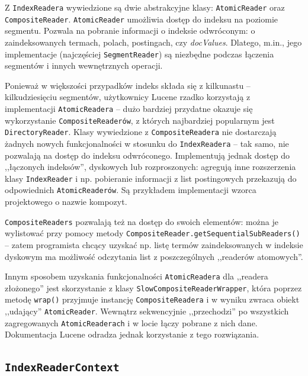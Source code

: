 Z \texttt{IndexReadera} wywiedzione są dwie abstrakcyjne klasy: \texttt{AtomicReader} oraz \texttt{CompositeReader}. \texttt{AtomicReader} umożliwia dostęp do indeksu na poziomie segmentu. Pozwala na pobranie informacji o indeksie odwróconym: o zaindeksowanych termach, polach, postingach, czy \emph{docValues}. Dlatego, m.in., jego implementacje (najczęściej \texttt{SegmentReader}) są niezbędne podczas łączenia segmentów i innych wewnętrznych operacji.

Ponieważ w większości przypadków indeks składa się z kilkunastu -- kilkudziesięciu segmentów, użytkownicy Lucene rzadko korzystają z implementacji \texttt{AtomicReadera} -- dużo bardziej przydatne okazuje się wykorzystanie \texttt{CompositeReaderów}, z których najbardziej popularnym jest \texttt{DirectoryReader}. Klasy wywiedzione z \texttt{CompositeReadera} nie dostarczają żadnych nowych funkcjonalności w stosunku do \texttt{IndexReadera} -- tak samo, nie pozwalają na dostęp do indeksu odwróconego. Implementują jednak dostęp do ,,łączonych indeksów'', dyskowych lub rozproszonych: agregują inne rozszerzenia klasy \texttt{IndexReader} i np. pobieranie informacji z list postingowych przekazują do odpowiednich \texttt{AtomicReaderów}. Są przykładem implementacji wzorca projektowego o nazwie kompozyt.

\texttt{CompositeReaders} pozwalają też na dostęp do swoich elementów: można je wylistować przy pomocy metody \texttt{CompositeReader.getSequentialSubReaders()} -- zatem programista chcący uzyskać np. listę termów zaindeksowanych w indeksie dyskowym ma możliwość odczytania list z poszczególnych ,,readerów atomowych''.

Innym sposobem uzyskania funkcjonalności \texttt{AtomicReadera} dla ,,readera złożonego'' jest skorzystanie z klasy \texttt{SlowCompositeReaderWrapper}, która poprzez metodę \texttt{wrap()} przyjmuje instancję \texttt{CompositeReadera} i w wyniku zwraca obiekt ,,udający'' \texttt{AtomicReader}. Wewnątrz sekwencyjnie ,,przechodzi'' po wszystkich zagregowanych \texttt{AtomicReaderach} i w locie łączy pobrane z nich dane. Dokumentacja Lucene odradza jednak korzystanie z tego rozwiązania.

\subsection{\texttt{IndexReaderContext}}

